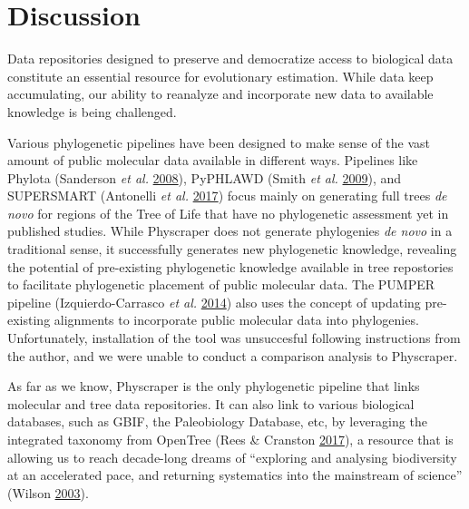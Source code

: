 \documentclass[]{article}
\begin{document}
\hypertarget{discussion}{%
\section{Discussion}\label{discussion}}

Data repositories designed to preserve and democratize access to biological data
constitute an essential resource for evolutionary estimation. While data keep accumulating,
our ability to reanalyze and incorporate new data to available knowledge is being challenged.

Various phylogenetic pipelines have been designed to make sense of the vast amount of public molecular data available in different ways.
Pipelines like Phylota (Sanderson \emph{et al.} \protect\hyperlink{ref-sanderson2008phylota}{2008}), PyPHLAWD (Smith \emph{et al.} \protect\hyperlink{ref-smith2009mega}{2009}), and SUPERSMART (Antonelli \emph{et al.} \protect\hyperlink{ref-antonelli2017toward}{2017})
focus mainly on generating full trees \emph{de novo} for regions of the Tree of
Life that have no phylogenetic assessment yet in published studies.
While Physcraper does not generate phylogenies \emph{de novo} in a traditional sense,
it successfully generates new phylogenetic knowledge, revealing the potential of pre-existing
phylogenetic knowledge available in tree repostories to facilitate phylogenetic placement of public molecular data.
The PUMPER pipeline (Izquierdo-Carrasco \emph{et al.} \protect\hyperlink{ref-izquierdo2014pumper}{2014}) also uses the concept of updating
pre-existing alignments to incorporate public molecular data into phylogenies. Unfortunately, installation of the tool was unsuccesful following instructions from the author, and we were unable to conduct a comparison analysis to Physcraper.

As far as we know, Physcraper is the only phylogenetic pipeline that links molecular and tree data repositories.
It can also link to various biological databases, such as GBIF, the Paleobiology Database, etc, by leveraging the integrated taxonomy from OpenTree (Rees \& Cranston \protect\hyperlink{ref-rees2017automated}{2017}), a resource that is allowing us to reach decade-long dreams of ``exploring and analysing biodiversity at an accelerated pace, and returning systematics into the mainstream of science'' (Wilson \protect\hyperlink{ref-wilson2003encyclopedia}{2003}).
\end{document}

